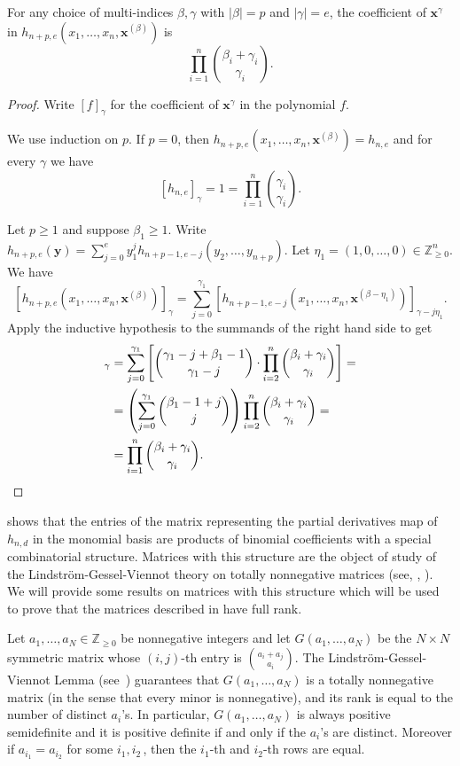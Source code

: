 \documentclass{toc}
\newcommand{\vvirg}{ , \dots , }
\newcommand{\textprod}{{\textstyle \prod}}
\newcommand{\bfx}{\mathbf{x}}
\newcommand{\bfy}{\mathbf{y}}
\newcommand{\bbZ}{\mathbb{Z}}
\begin{document}
\begin{proposition}\label{prop: coefficients of monomials is expanded h}
For any choice of multi-indices $\beta,\gamma$ with $\vert \beta \vert = p$ and $\vert \gamma \vert = e$, the coefficient of $\bfx^\gamma$ in $h_{n+p,e} ( x_1 \vvirg x_n, \bfx^{(\beta)})$ is 
\[
 \prod_{i=1}^n \binom{\beta_i + \gamma_i}{\gamma_i}.
\]
\end{proposition}
\begin{proof}
Write $[f]_{\gamma}$ for the coefficient of $\bfx^\gamma$ in the polynomial $f$.

We use induction on $p$. If $p = 0$, then $h_{n+p,e} ( x_1 \vvirg x_n, \bfx^{(\beta)}) = h_{n,e}$ and for every $\gamma$ we have
\[
  [h_{n,e}]_\gamma = 1 =  \textprod_{i=1}^n \binom{\gamma_i}{\gamma_i}.
\]

Let $p\geq 1$ and suppose $\beta_1 \geq 1$. Write $h_{n+p,e}(\bfy) = \sum_{j=0}^e y_1^{j} h_{n+p-1,e-j}(y_2 \vvirg y_{n+p})$. Let $\eta_1 = (1 ,0\vvirg 0) \in \bbZ^{n}_{\geq 0}$. We have
\[
 [h_{n+p,e}(x_1 \vvirg x_n,\bfx^{(\beta)})]_\gamma = \sum_{j=0}^{\gamma_1} [h_{n+p-1,e-j}(x_1 \vvirg x_n, \bfx^{(\beta-\eta_1)})]_{\gamma-j\eta_1}.
\]
Apply the inductive hypothesis to the summands of the right hand side  to get 
\begin{align*}
 [h_{n+p,e}(x_1 \vvirg x_n,\bfx^{(\beta)})]_\gamma &= \sum_{j=0}^{\gamma_1} \left[\binom{\gamma_1 - j + \beta_1 -1 }{\gamma_1 -j} \cdot \prod_{i=2}^n \binom{\beta_i + \gamma_i}{\gamma_i}\right]  = \\ 
 &= \left( \sum_{j=0}^{\gamma_1} \binom{\beta_1 -1 +j}{j}\right) \prod_{i=2}^n \binom{\beta_i + \gamma_i}{\gamma_i}  =\\
 &= \prod_{i=1}^n \binom{\beta_i + \gamma_i}{\gamma_i}.\qedhere
\end{align*}
\end{proof}

 shows that the entries of the matrix representing the partial derivatives map of $h_{n,d}$ in the monomial basis are products of binomial coefficients with a special combinatorial structure. Matrices with this structure are the object of study of the Lindstr\"om-Gessel-Viennot theory on totally nonnegative matrices (see, \eg, \cite{MR815360}). We will provide some results on matrices with this structure which will be used to prove that the matrices described in  have full rank.

Let $a_1 \vvirg a_N \in \bbZ_{\geq 0}$ be nonnegative integers and let $G(a_1 \vvirg a_N)$ be the $N \times N$ symmetric matrix whose $(i,j)$-th entry is $\binom{a_i+a_j}{a_i}$. The Lindstr\"om-Gessel-Viennot Lemma (see~\cite[\S2]{MR815360}) guarantees that $G(a_1 \vvirg a_N)$ is a totally nonnegative matrix (in the sense that every minor is nonnegative), and its rank is equal to the number of distinct $a_i$'s. In particular, $G(a_1 \vvirg a_N)$ is always positive semidefinite and it is positive definite if and only if the $a_i$'s are distinct. Moreover if $a_{i_1} = a_{i_2}$ for some $i_1,i_2$\,, then the $i_1$-th and $i_2$-th rows are equal. 
\end{document}
